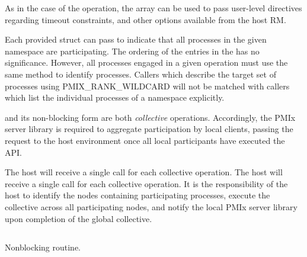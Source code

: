 As in the case of the  operation, the  array can be used to pass user-level directives regarding timeout constraints, and other options available from the host \ac{RM}.

Each provided  struct can pass  to indicate that all processes in the given namespace are participating.
The ordering of the entries in the  has no significance.  However, all processes engaged in a given
operation must use the same method to identify processes.  Callers which describe
the target set of processes using PMIX_RANK_WILDCARD will not be matched with
callers which list the individual processes of a namespace explicitly.

\adviceimplstart
{} and its non-blocking form are both \emph{collective} operations. Accordingly, the \ac{PMIx} server library is required to aggregate participation by local clients, passing the request to the host environment once all local participants have executed the \ac{API}.
\adviceimplend

\advicermstart
The host will receive a single call for each collective operation. The host will receive a single call for each collective operation. It is the responsibility of the host to identify the nodes containing participating processes, execute the collective across all participating nodes, and notify the local \ac{PMIx} server library upon completion of the global collective.

\advicermend


\subsection{}

\summary

Nonblocking  routine.

\format


